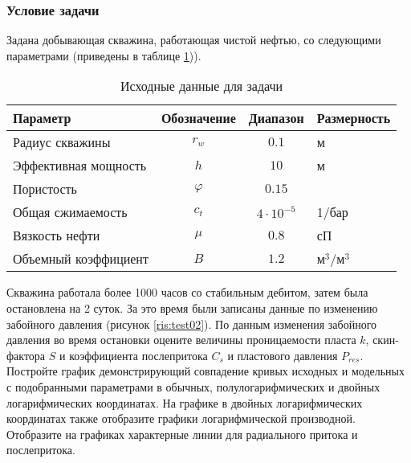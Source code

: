 \subsubsection{Условие задачи}
Задана добывающая скважина, работающая чистой нефтью, со следующими параметрами (приведены в таблице \ref{table:test_data2})).

\begin{table}[h!]
	{
		\caption{Исходные данные для задачи}
		\label{table:test_data2}
	}
	{
		\begin{tabular}{|l|c|c|l|}
			\hline
			\rowcolor{lightgray}	Параметр& Обозначение &Диапазон &Размерность \\
			\hline
			Радиус скважины&  $r_{w} $&$ 0.1 $ &м \\
			\hline
			Эффективная мощность & $h $&$ 10$ &м  \\
			\hline
			Пористость & $\varphi $&$ 0.15 $&  \\
			\hline
			Общая сжимаемость& $c_{t} $&$ 4\cdot 10^{-5}  $ & 1/бар  \\
			\hline
			Вязкость нефти& $\mu $&$ 0.8$& сП  \\
			\hline
			Объемный коэффициент   &$B $&$ 1.2$& м$^3$/м$^3$  \\
			\hline
		\end{tabular}
		
	}
\end{table}

Скважина работала более 1000 часов со стабильным дебитом, затем была остановлена на 2 суток. За это время были записаны данные по изменению забойного давления (рисунок \ref{ris:test02}). По данным изменения забойного давления во время остановки оцените величины проницаемости пласта $k$, скин-фактора $S$ и коэффициента послепритока $C_s$ и пластового давления $P_{res} $. Постройте график демонстрирующий совпадение кривых исходных и модельных с подобранными параметрами в обычных, полулогарифмических и двойных логарифмических координатах. На графике в двойных логарифмических координатах также отобразите графики логарифмической производной. Отобразите на графиках характерные линии для радиального притока и послепритока.

